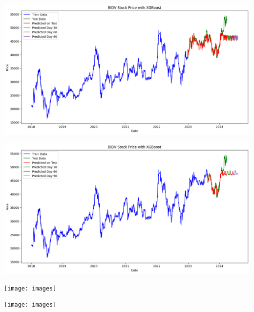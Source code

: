 \documentclass[conference]{IEEEtran}
\begin{document}
\begin{minipage}{0.23\textwidth}
    \centering
    \includegraphics[width=\linewidth]{images/XGBoost/XGBoost_BIDV_82.png}
    \label{fig:image1}
\end{minipage}
\hfill
\begin{minipage}{0.23\textwidth}
    \centering
    \includegraphics[width=\linewidth]{images/XGBoost/XGBoost_BIDV_91.png}
    \label{fig:image2}
\end{minipage}

\begin{minipage}{0.23\textwidth}
    \centering
    \texttt{[image: images]}
    \label{fig:image1}
\end{minipage}
\hfill
\begin{minipage}{0.23\textwidth}
    \centering
    \texttt{[image: images]}
    \label{fig:image2}
\end{minipage}
\end{document}

